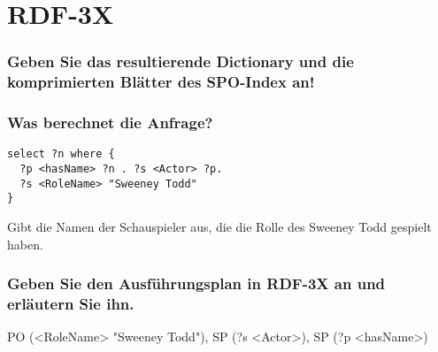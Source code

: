 \documentclass[11pt,a4paper]{scrartcl}
\begin{document}
\section{RDF-3X}
\subsubsection*{Geben Sie das resultierende Dictionary und die komprimierten Blätter des SPO-Index an!}


\subsubsection*{Was berechnet die Anfrage?}
\begin{verbatim}
select ?n where {
  ?p <hasName> ?n . ?s <Actor> ?p.
  ?s <RoleName> "Sweeney Todd"
}
\end{verbatim}
Gibt die Namen der Schauspieler aus, die die Rolle des Sweeney Todd gespielt haben.

\subsubsection*{Geben Sie den Ausführungsplan in RDF-3X an und erläutern Sie ihn.}
PO (<RoleName> "Sweeney Todd"), SP (?s <Actor>), SP (?p <hasName>)
\end{document}
